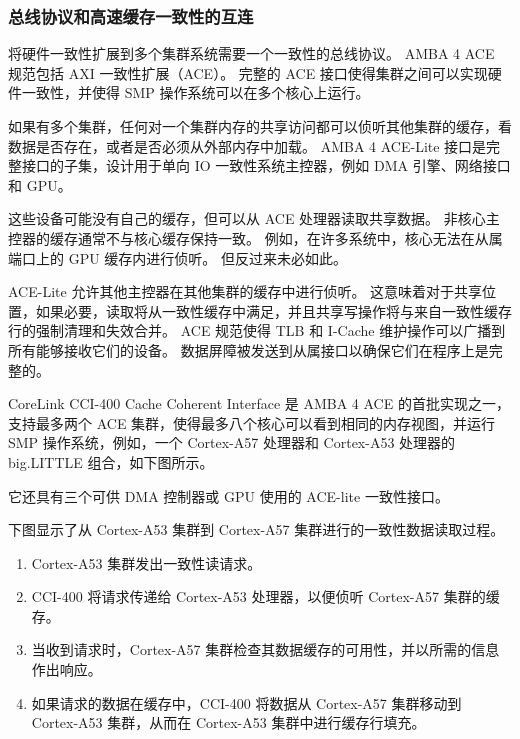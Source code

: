 \subsubsection{总线协议和高速缓存一致性的互连}

将硬件一致性扩展到多个集群系统需要一个一致性的总线协议。
AMBA 4
ACE 规范包括 AXI 一致性扩展（ACE）。
完整的 ACE 接口使得集群之间可以实现硬件一致性，并使得 SMP 操作系统可以在多个核心上运行。

如果有多个集群，任何对一个集群内存的共享访问都可以侦听其他集群的缓存，看数据是否存在，或者是否必须从外部内存中加载。
AMBA 4 ACE-Lite 接口是完整接口的子集，设计用于单向 IO 一致性系统主控器，例如 DMA 引擎、网络接口和 GPU。

这些设备可能没有自己的缓存，但可以从 ACE 处理器读取共享数据。
非核心主控器的缓存通常不与核心缓存保持一致。
例如，在许多系统中，核心无法在从属端口上的 GPU 缓存内进行侦听。
但反过来未必如此。

ACE-Lite 允许其他主控器在其他集群的缓存中进行侦听。
这意味着对于共享位置，如果必要，读取将从一致性缓存中满足，并且共享写操作将与来自一致性缓存行的强制清理和失效合并。
ACE 规范使得 TLB 和 I-Cache 维护操作可以广播到所有能够接收它们的设备。
数据屏障被发送到从属接口以确保它们在程序上是完整的。

CoreLink CCI-400 Cache Coherent Interface 是 AMBA 4 ACE 的首批实现之一，支持最多两个 ACE 集群，使得最多八个核心可以看到相同的内存视图，并运行 SMP 操作系统，例如，一个 Cortex-A57 处理器和 Cortex-A53 处理器的 big.LITTLE 组合，如下图所示。


它还具有三个可供 DMA 控制器或 GPU 使用的 ACE-lite 一致性接口。

下图显示了从 Cortex-A53 集群到 Cortex-A57 集群进行的一致性数据读取过程。

\begin{enumerate}
\item
  Cortex-A53 集群发出一致性读请求。
\item
  CCI-400 将请求传递给 Cortex-A53 处理器，以便侦听 Cortex-A57 集群的缓存。
\item
  当收到请求时，Cortex-A57 集群检查其数据缓存的可用性，并以所需的信息作出响应。
\item
  如果请求的数据在缓存中，CCI-400 将数据从 Cortex-A57 集群移动到 Cortex-A53 集群，从而在 Cortex-A53 集群中进行缓存行填充。
\end{enumerate}


